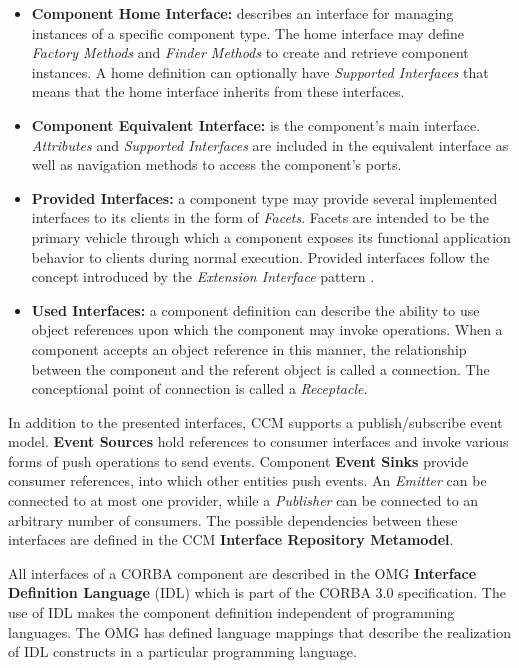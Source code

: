 \begin{itemize}
\item {\bf Component Home Interface:} describes an interface for managing 
instances
of a specific component type.
The home interface may define {\it Factory Methods} and {\it Finder Methods} to 
create and retrieve component instances.
A home definition can optionally have {\it Supported Interfaces} that means that
the home interface inherits from these interfaces.

\item {\bf Component Equivalent Interface:} is the component's main interface.
{\it Attributes} and {\it Supported Interfaces} are included in the equivalent
interface as well as navigation methods to access the component's ports. 

\item {\bf Provided Interfaces:} a component type may provide several 
implemented interfaces to its clients in the form of {\it Facets}.
Facets are intended to be the primary vehicle through which a component exposes
its functional application behavior to clients during normal execution.
Provided interfaces follow the concept introduced by the 
{\it Extension Interface} pattern \cite{POSA2}.

\item {\bf Used Interfaces:} a component definition can describe the ability
to use object references upon which the component may invoke operations.
When a component accepts an object reference in this manner, the relationship
between the component and the referent object is called a connection.
The conceptional point of connection is called a {\it Receptacle}.
\end{itemize}

\noindent
In addition to the presented interfaces, CCM supports a publish/subscribe event 
model.
{\bf Event Sources} hold references to consumer interfaces and invoke various 
forms of push operations to send events.
Component {\bf Event Sinks} provide consumer references, into which other 
entities push events.
An {\it Emitter} can be connected to at most one provider, while a 
{\it Publisher} can be connected to an arbitrary number of consumers.
The possible dependencies between these interfaces are defined in the CCM 
{\bf Interface Repository Metamodel}.

\vspace{3mm}
\noindent
All interfaces of a CORBA component are described in the OMG 
{\bf Interface Definition Language} (IDL) which is part of the CORBA 3.0 
specification.
The use of IDL makes the component definition independent of programming 
languages.
The OMG has defined language mappings that describe the realization of IDL 
constructs in a particular programming language.

